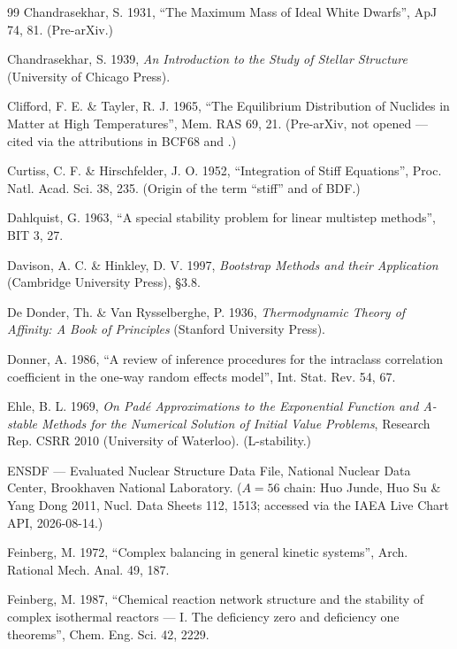 \begin{thebibliography}{99}
Chandrasekhar, S. 1931, ``The Maximum Mass of Ideal White Dwarfs'', ApJ 74, 81.
(Pre-arXiv.)

Chandrasekhar, S. 1939, \emph{An Introduction to the Study of Stellar
Structure} (University of Chicago Press).

Clifford, F. E. \& Tayler, R. J. 1965, ``The Equilibrium Distribution of
Nuclides in Matter at High Temperatures'', Mem. RAS 69, 21. (Pre-arXiv, not
opened --- cited via the attributions in BCF68 and \citealp{ht1999b}.)

Curtiss, C. F. \& Hirschfelder, J. O. 1952, ``Integration of Stiff Equations'',
Proc. Natl. Acad. Sci. 38, 235. (Origin of the term ``stiff'' and of BDF.)

Dahlquist, G. 1963, ``A special stability problem for linear multistep
methods'', BIT 3, 27.

Davison, A. C. \& Hinkley, D. V. 1997, \emph{Bootstrap Methods and their
Application} (Cambridge University Press), \S3.8.

De Donder, Th. \& Van Rysselberghe, P. 1936, \emph{Thermodynamic Theory of
Affinity: A Book of Principles} (Stanford University Press).

Donner, A. 1986, ``A review of inference procedures for the intraclass
correlation coefficient in the one-way random effects model'', Int. Stat. Rev.
54, 67.

Ehle, B. L. 1969, \emph{On Pad\'e Approximations to the Exponential Function
and A-stable Methods for the Numerical Solution of Initial Value Problems},
Research Rep. CSRR 2010 (University of Waterloo). (L-stability.)

ENSDF --- Evaluated Nuclear Structure Data File, National Nuclear Data Center,
Brookhaven National Laboratory. ($A = 56$ chain: Huo Junde, Huo Su \& Yang Dong
2011, Nucl. Data Sheets 112, 1513; accessed via the IAEA Live Chart API,
2026-08-14.)

Feinberg, M. 1972, ``Complex balancing in general kinetic systems'', Arch.
Rational Mech. Anal. 49, 187.

Feinberg, M. 1987, ``Chemical reaction network structure and the stability of
complex isothermal reactors --- I. The deficiency zero and deficiency one
theorems'', Chem. Eng. Sci. 42, 2229.


\end{thebibliography}
